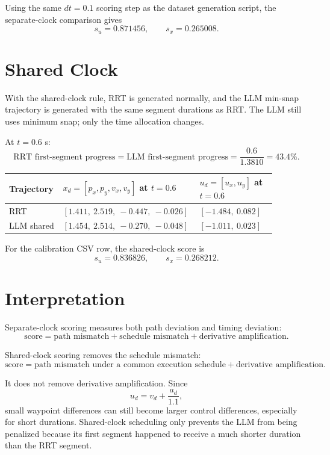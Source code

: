\documentclass[11pt]{article}
\begin{document}
Using the same $dt=0.1$ scoring step as the dataset generation script, the
separate-clock comparison gives
\[
s_u = 0.871456,\qquad s_x = 0.265008.
\]

\section*{Shared Clock}

With the shared-clock rule, RRT is generated normally, and the LLM min-snap
trajectory is generated with the same segment durations as RRT.  The LLM still
uses minimum snap; only the time allocation changes.

At $t=0.6$ s:
\[
\text{RRT first-segment progress}
=
\text{LLM first-segment progress}
=
\frac{0.6}{1.3810}
=
43.4\%.
\]

\begin{center}
\begin{tabular}{>{\raggedright\arraybackslash}p{0.18\linewidth}
                >{\raggedright\arraybackslash}p{0.42\linewidth}
                >{\raggedright\arraybackslash}p{0.28\linewidth}}
\hline
Trajectory & $x_d=[p_x,p_y,v_x,v_y]$ at $t=0.6$ & $u_d=[u_x,u_y]$ at $t=0.6$\\
\hline
RRT & $[1.411,\ 2.519,\ -0.447,\ -0.026]$ & $[-1.484,\ 0.082]$\\
LLM shared & $[1.454,\ 2.514,\ -0.270,\ -0.048]$ & $[-1.011,\ 0.023]$\\
\hline
\end{tabular}
\end{center}

For the calibration CSV row, the shared-clock score is
\[
s_u = 0.836826,\qquad s_x = 0.268212.
\]

\section*{Interpretation}

Separate-clock scoring measures both path deviation and timing deviation:
\[
\text{score} =
\text{path mismatch}
+
\text{schedule mismatch}
+
\text{derivative amplification}.
\]

Shared-clock scoring removes the schedule mismatch:
\[
\text{score} =
\text{path mismatch under a common execution schedule}
+
\text{derivative amplification}.
\]

It does not remove derivative amplification.  Since
\[
u_d = v_d + \frac{a_d}{1.1},
\]
small waypoint differences can still become larger control differences,
especially for short durations.  Shared-clock scheduling only prevents the LLM
from being penalized because its first segment happened to receive a much shorter
duration than the RRT segment.
\end{document}
